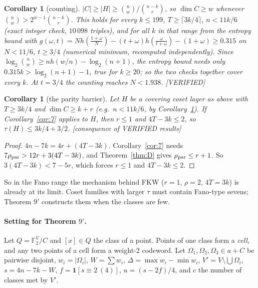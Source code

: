 \documentclass[11pt]{article}
\newtheorem{corollary}[theorem]{Corollary}
\theoremstyle{definition}
\newcommand{\st}[1]{\textsf{\small[#1]}}
\newcommand{\F}{\mathbb{F}_2}
\begin{document}
\begin{corollary}[counting]\label{cor:count}
$|C|\ge|H|\ge\binom nw/\binom{n-k}r$, so $\dim C\ge w$ whenever $\binom nw>2^{w-1}\binom{n-k}r$. This holds for every
$k\le199$, $T\ge\lceil3k/4\rceil$, $n<11k/6$ (exact integer check, $10\,098$ triples), and for all $k$ in that range
from the entropy bound with $g(\omega,t)=Nh(\tfrac{1+\omega}N)-(t+\omega)h(\tfrac\omega{t+\omega})-(1+\omega)\ge0.315$
on $N<11/6$, $t\ge3/4$ (numerical minimum, recomputed independently). Since
$\log_2\binom nw\ge nh(w/n)-\log_2(n+1)$, the entropy bound needs only $0.315k>\log_2(n+1)-1$, true for $k\ge20$; so
the two checks together cover every $k$. At $t=3/4$ the counting reaches $N<1.938$.
\st{VERIFIED}
\end{corollary}

\begin{corollary}[the parity barrier]\label{cor:barrier}
Let $H$ be a covering coset layer as above with $T\ge3k/4$ and $\dim C\ge k+r$ (e.g.\ $n<11k/6$, by
Corollary~\ref{cor:count}). If Corollary~\ref{cor:7} applies to $H$, then $r\le1$ and $4T-3k\le2$, so
$\tau(H)\le3k/4+3/2$. \st{consequence of VERIFIED results}
\end{corollary}
\begin{proof}
$4n-7k=4r+(4T-3k)$. Corollary~\ref{cor:7} needs $7\rho_{\rm par}>12r+3(4T-3k)$, and Theorem~\ref{thm:D} gives
$\rho_{\rm par}\le r+1$. So $3(4T-3k)<7-5r$, which forces $r\le1$ and $4T-3k\le2$.
\end{proof}
So in the Fano range the mechanism behind FKW ($r=1$, $\rho=2$, $4T=3k$) is already at its limit. Coset families with
larger $\tau$ must contain Fano-type sevens; Theorem $9'$ constructs them when the classes are few.

\paragraph{Setting for Theorem $9'$.} Let $Q=\F^V/C$ and $[x]\in Q$ the class of a point. Points of one class form a
\emph{cell}, and any two points of a cell form a weight-2 codeword. Let $\Omega_1,\Omega_2,\Omega_3\in a+C$ be pairwise
disjoint, $w_i=|\Omega_i|$, $W=\sum w_i$, $\Delta=\max w_i-\min w_i$, $V'=V\setminus\bigcup\Omega_i$,
$s=4n-7k-W$, $f=\mathbf 1[s\equiv2\ (4)]$, $u=(s-2f)/4$, and $c$ the number of classes met by $V'$.
\end{document}
